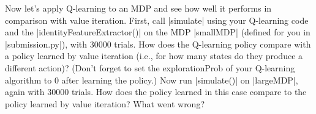 \item {}
Now let's apply Q-learning to an MDP and see how well it performs in comparison
with value iteration.  First, call |simulate| using your Q-learning code and the
|identityFeatureExtractor()| on the MDP |smallMDP| (defined for you in
|submission.py|), with 30000 trials. How does the Q-learning policy compare with
a policy learned by value iteration (i.e., for how many states do they produce a
different action)? (Don't forget to set the explorationProb of your Q-learning
algorithm to 0 after learning the policy.) Now run |simulate()| on |largeMDP|,
again with 30000 trials.  How does the policy learned in this case compare to
the policy learned by value iteration?  What went wrong?
